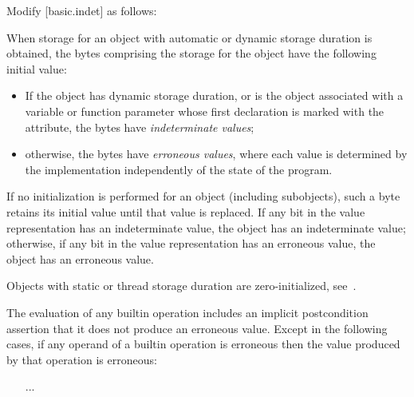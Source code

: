 Modify [basic.indet] as follows:


\begin{adjustwidth}{0.5cm}{0.5cm}
When storage for an object with automatic or dynamic storage duration
is obtained,
the bytes comprising the storage for the object
have the following initial value:
\begin{itemize}
\item
If the object has dynamic storage duration, or
is the object associated with a variable or function parameter
whose first declaration is marked with
the \tcode{[[indeterminate]]} attribute,
the bytes have \emph{indeterminate values};
\item
otherwise, the bytes have \emph{erroneous values},
where each value is determined by the implementation
independently of the state of the program.
\end{itemize}
If no initialization is performed for an object (including subobjects),
such a byte retains its initial value
until that value is replaced.
If any bit in the value representation has an indeterminate value,
the object has an indeterminate value;
otherwise, if any bit in the value representation has an erroneous value,
the object has an erroneous value.
\begin{note}
Objects with static or thread storage duration are zero-initialized,
see~.
\end{note}


\begin{addedblock}
The evaluation of any builtin operation includes an implicit postcondition assertion
that it does not produce an erroneous value.  Except in the following cases,
if any operand of a builtin operation is erroneous then the value
produced by that operation is erroneous:
\begin{itemize}
\item [...]
\end{itemize}
\end{addedblock}


\end{adjustwidth}
